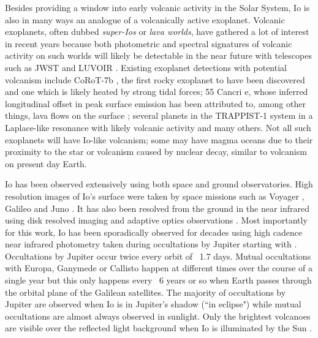 \documentclass[modern]{aastex62}
\begin{document}
Besides providing a window into early volcanic activity in the Solar System, Io is also in many ways an analogue of a volcanically active exoplanet.
Volcanic exoplanets, often dubbed \emph{super-Ios} or \emph{lava worlds}, have gathered a lot of interest in recent years because both photometric and spectral signatures of volcanic activity on such worlds will likely be detectable in the near future with telescopes such as JWST and LUVOIR \citep{kaltenegger2010,henning2018,oza2019,chao2020}.
Existing exoplanet detections with potential volcanism include CoRoT-7b \citep{barnes2010}, the first rocky exoplanet to have been discovered and one which is likely heated by strong tidal forces; 55 Cancri e, whose inferred longitudinal offset in peak surface emission has been attributed to, among other things, lava flows on the surface \citep{demory2016,demory2016a,hammond2017}; several planets in the TRAPPIST-1 system in a Laplace-like resonance with likely volcanic activity \citep{kislyakova2017,dobos2019} and many others.
Not all such exoplanets will have Io-like volcanism; some may have magma oceans due to their proximity to the star or volcanism caused by nuclear decay, similar to volcanism on present day Earth.

Io has been observed extensively using both space and ground observatories.
High resolution images of Io's surface were taken by space missions such as Voyager \citep{smith1979}, Galileo \citep{belton1996} and Juno \citep{mura2020}.
It has also been resolved from the ground in the near infrared using disk resolved imaging
\citep{howell1985,simonelli1986,spencer1990} and adaptive optics observations \citep{marchis2000,marchis2005,dekleer2016}.
Most importantly for this work, Io has been sporadically observed for decades using high cadence near infrared photometry taken during occultations by Jupiter starting with \cite{spencer1990}.
Occultations by Jupiter occur twice every orbit of ~1.7 days.
Mutual occultations with Europa, Ganymede or Callisto happen at different times over the course of a single year but this only happens every ~6 years or so when Earth passes through the orbital plane of the Galilean satellites.
The majority of occultations by Jupiter are observed when Io is in Jupiter's shadow (``in eclipse") while mutual occultations are almost always observed in sunlight.
Only the brightest volcanoes are visible over the reflected light background when Io is illuminated by the Sun \citep{veeder1994,dekleer2016a}.
\end{document}
